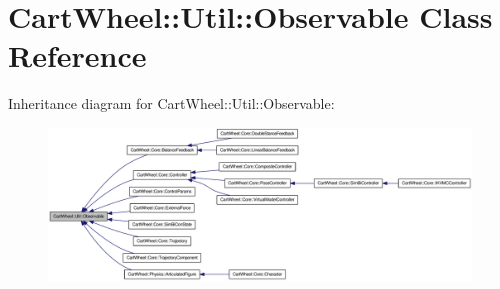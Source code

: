 \hypertarget{classCartWheel_1_1Util_1_1Observable}{
\section{CartWheel::Util::Observable Class Reference}
\label{classCartWheel_1_1Util_1_1Observable}
}


Inheritance diagram for CartWheel::Util::Observable:\nopagebreak
\begin{figure}[H]
\begin{center}
\leavevmode
\includegraphics[width=400pt]{classCartWheel_1_1Util_1_1Observable__inherit__graph}
\end{center}
\end{figure}
